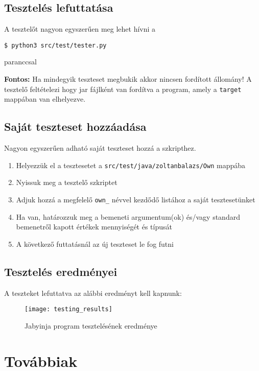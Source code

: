 \subsection{Tesztelés lefuttatása}

A tesztelőt nagyon egyszerűen meg lehet hívni a
\begin{verbatim}
$ python3 src/test/tester.py
\end{verbatim}
paranccsal

\textbf{Fontos:} Ha mindegyik teszteset megbukik akkor nincsen fordított állomány! A tesztelő feltételezi hogy jar fájlként van fordítva a program, amely a \lstinline{target} mappában van elhelyezve.

\subsection{Saját teszteset hozzáadása}

Nagyon egyszerűen adható saját teszteset hozzá a szkripthez.
\begin{enumerate}
	\item Helyezzük el a tesztesetet a \lstinline{src/test/java/zoltanbalazs/Own} mappába
	\item Nyissuk meg a tesztelő szkriptet
	\item Adjuk hozzá a megfelelő \lstinline{own_} névvel kezdődő listához a saját tesztesetünket
	\item Ha van, határozzuk meg a bemeneti argumentum(ok) és/vagy standard bemenetről kapott értékek mennyiségét és típusát
	\item A következő futtatásnál az új teszteset le fog futni
\end{enumerate}

\subsection{Tesztelés eredményei}

A teszteket lefuttatva az alábbi eredményt kell kapnunk:

\begin{figure}[H]
	\centering
	\texttt{[image: testing\_results]}
	\caption{Jabyinja program tesztelésének eredménye}
	\label{fig:testing}
\end{figure}

\section{Továbbiak}

